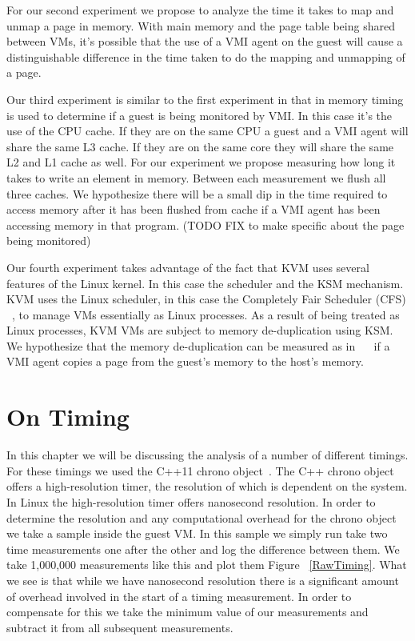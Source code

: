 For our second experiment we propose to analyze the time it takes to map and unmap a page in memory. With main memory and the page table being shared between VMs,  it's possible that the use of a VMI agent on the guest will cause a distinguishable difference in the time taken to do the mapping and unmapping of a page.

Our third experiment is similar to the first experiment in that in memory timing is used to determine if a guest is being monitored by VMI. In this case it's the use of the CPU cache. If they are on the same CPU a guest and a VMI agent will share the same L3 cache. If they are on the same core they will share the same L2 and L1 cache as well. For our experiment we propose measuring how long it takes to write an element in memory. Between each measurement we flush all three caches. We hypothesize there will be a small dip in the time required to access memory after it has been flushed from cache if a VMI agent has been accessing memory in that program. (TODO FIX to make specific about the page being monitored) 


Our fourth experiment takes advantage of the fact that KVM uses several features of the Linux kernel. In this case the scheduler and the KSM mechanism. KVM uses the Linux scheduler, in this case the Completely Fair Scheduler (CFS) ~\cite{pabla_completely_2009}, to manage VMs essentially as Linux processes. As a result of being treated as Linux processes, KVM VMs are subject to memory de-duplication using KSM. We hypothesize that the memory de-duplication can be measured as in ~\cite{xiao_security_2013}~\cite{owens_non-interactive_2011} if a VMI agent copies a page from the guest's memory to the host's memory.

\section{On Timing}

In this chapter we will be discussing the analysis of a number of different timings. For these timings we used the C++11 chrono object~\cite{_chrono_2014}. The C++ chrono object offers a high-resolution timer, the resolution of which is dependent on the system. In Linux the high-resolution timer offers nanosecond resolution.  In order to determine the resolution and any computational overhead for the chrono object we take a sample inside the guest VM. In this sample we simply run take two time measurements one after the other and log the difference between them. We take 1,000,000 measurements like this and plot them Figure ~\ref{RawTiming}. What we see is that while we have nanosecond resolution there is a significant amount of overhead involved in the start of a timing measurement. In order to compensate for this we take the minimum value of our measurements and subtract it from all subsequent measurements. 

